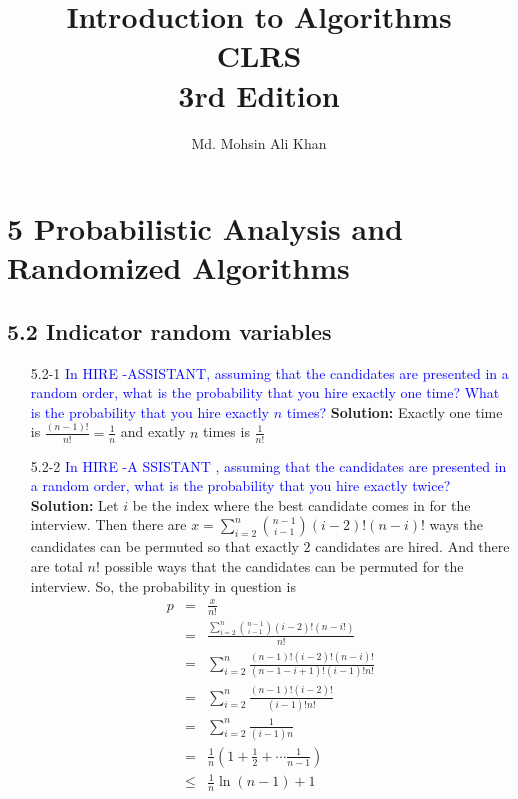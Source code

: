 \documentclass{article}
\begin{document}
\title{Introduction to Algorithms\\CLRS\\3rd Edition}
\author{Md. Mohsin Ali Khan}

\maketitle
\section*{5 Probabilistic Analysis and Randomized Algorithms}
\subsection*{5.2 Indicator random variables}
\begin{enumerate}
\item[5.2-1] \textcolor{blue}{In HIRE -ASSISTANT, assuming that the candidates are presented in a random order, what is the probability that you hire exactly one time? What is the probability that you hire exactly $n$ times?}
\textbf{Solution:} Exactly one time is $\frac{(n-1)!}{n!}=\frac{1}{n}$ and exatly $n$ times is $\frac{1}{n!}$
\item[5.2-2] \textcolor{blue}{In HIRE -A SSISTANT , assuming that the candidates are presented in a random order, what is the probability that you hire exactly twice?}
\textbf{Solution:} Let $i$ be the index where the best candidate comes in for the interview. Then there are $x = \sum_{i=2}^{n}\binom{n-1}{i-1}(i-2)!(n-i)!$ ways the candidates can be permuted so that exactly $2$ candidates are hired. And there are total $n!$ possible ways that the candidates can be permuted for the interview. So, the probability in question is 
\begin{eqnarray*}
p &=& \frac{x}{n!}\\
&=& \frac{\sum_{i=2}^{n}\binom{n-1}{i-1}(i-2)!(n-i!)}{n!}\\
&=& \sum_{i=2}^{n}\frac{(n-1)!(i-2)!(n-i)!}{(n-1-i+1)!(i-1)!n!}\\
&=& \sum_{i=2}^{n}\frac{(n-1)!(i-2)!}{(i-1)!n!}\\
&=& \sum_{i=2}^{n}\frac{1}{(i-1)n}\\
&=& \frac{1}{n}\left(1+\frac{1}{2}+ \cdots \frac{1}{n-1}\right)\\
&\leq& \frac{1}{n}\ln(n-1) + 1
\end{eqnarray*}


\end{enumerate}
\end{document}
